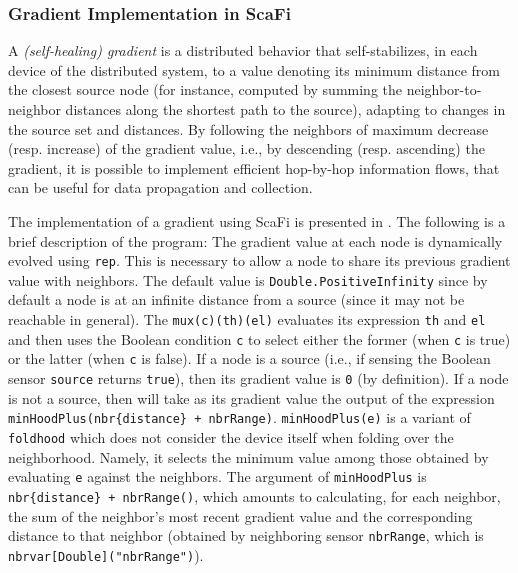 \subsubsection{Gradient Implementation in ScaFi}

A \textit{(self-healing) gradient} is a distributed behavior that self-stabilizes, in each device of the distributed system, to a value denoting its minimum distance from the closest source node (for instance, computed by summing the neighbor-to-neighbor distances along the shortest path to the source), adapting to changes in the source set and distances. By following the neighbors of maximum decrease (resp. increase) of the gradient value, i.e., by descending (resp. ascending) the gradient, it is possible to implement efficient hop-by-hop information flows, that can be useful for data propagation and collection.

The implementation of a gradient using ScaFi is presented in . The following is a brief description of the program:
The gradient value at each node is dynamically evolved using \texttt{rep}. This is necessary to allow a node to share its previous gradient value with neighbors. The default value is \texttt{Double.PositiveInfinity} since by default a node is at an infinite distance from a source (since it may not be reachable in general). The \texttt{mux(c)(th)(el)} evaluates its expression \texttt{th} and \texttt{el} and then uses the Boolean condition \texttt{c} to select either the former (when \texttt{c} is true) or the latter (when \texttt{c} is false).
If a node is a source (i.e., if sensing the Boolean sensor \texttt{source} returns \texttt{true}), then its gradient value is \texttt{0} (by definition).
If a node is not a source, then will take as its gradient value the output of the expression \texttt{minHoodPlus(nbr\{distance\} + nbrRange)}.
\texttt{minHoodPlus(e)} is a variant of \texttt{foldhood} which does not consider the device itself when folding over the neighborhood. Namely, it selects the minimum value among those obtained by evaluating \texttt{e} against the neighbors. The argument of \texttt{minHoodPlus} is \texttt{nbr\{distance\} + nbrRange()}, which amounts to calculating, for each neighbor, the sum of the neighbor's most recent gradient value and the corresponding distance to that neighbor (obtained by neighboring sensor \texttt{nbrRange}, which is \texttt{nbrvar[Double]("nbrRange")}).



